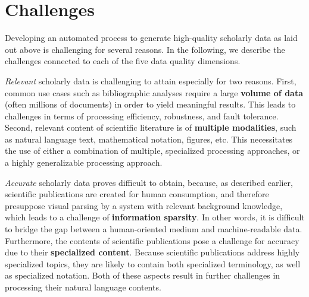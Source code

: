 \section{Challenges}\label{sec:intro-challenges}




Developing an automated process to generate high-quality scholarly data as laid out above is challenging for several reasons. In the following, we describe the challenges connected to each of the five data quality dimensions.

\textit{Relevant} scholarly data is challenging to attain especially for two reasons. First, common use cases such as bibliographic analyses require a large \textbf{volume of data} (often millions of documents) in order to yield meaningful results. This leads to challenges in terms of processing efficiency, robustness, and fault tolerance. Second, relevant content of scientific literature is of \textbf{multiple modalities}, such as natural language text, mathematical notation, figures, etc. This necessitates the use of either a combination of multiple, specialized processing approaches, or a highly generalizable processing approach.

\textit{Accurate} scholarly data proves difficult to obtain, because, as described earlier, scientific publications are created for human consumption, and therefore presuppose visual parsing by a system with relevant background knowledge, which leads to a challenge of \textbf{information sparsity}. In other words, it is difficult to bridge the gap between a human-oriented medium and machine-readable data. Furthermore, the contents of scientific publications pose a challenge for accuracy due to their \textbf{specialized content}. Because scientific publications address highly specialized topics, they are likely to contain both specialized terminology, as well as specialized notation. Both of these aspects result in further challenges in processing their natural language contents.


